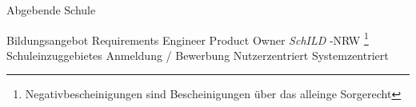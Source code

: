Abgebende Schule

Bildungsangebot
Requirements Engineer
Product Owner
 \textit{SchILD} -NRW
\footnote{Negativbescheinigungen sind Bescheinigungen über das alleinge Sorgerecht}
Schuleinzuggebietes
Anmeldung / Bewerbung
Nutzerzentriert
Systemzentriert